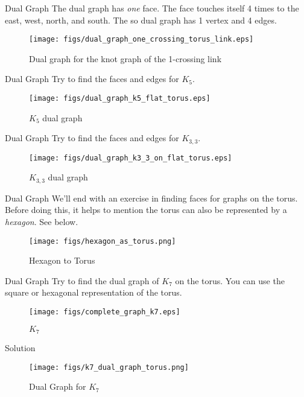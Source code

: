 \documentclass{beamer}
\begin{document}
    \begin{frame}{Dual Graph}
        The dual graph has \textit{one} face. The face touches itself
        4 times to the east, west, north, and south. The so dual graph
        has 1 vertex and 4 edges.
        \begin{figure}
            \centering
            \texttt{[image: figs/dual\_graph\_one\_crossing\_torus\_link.eps]}
            \caption{Dual graph for the knot graph of the 1-crossing link}
            \label{fig:dual_graph_one_crossing_torus_link}
        \end{figure}
    \end{frame}
    \begin{frame}{Dual Graph}
        Try to find the faces and edges for $K_{5}$.
        \begin{figure}
            \centering
            \texttt{[image: figs/dual\_graph\_k5\_flat\_torus.eps]}
            \caption{$K_{5}$ dual graph}
            \label{fig:k5_dual}
        \end{figure}
    \end{frame}
    \begin{frame}{Dual Graph}
        Try to find the faces and edges for $K_{3,3}$.
        \begin{figure}
            \centering
            \texttt{[image: figs/dual\_graph\_k3\_3\_on\_flat\_torus.eps]}
            \caption{$K_{3,3}$ dual graph}
            \label{fig:k3_3_dual}
        \end{figure}
    \end{frame}
    \begin{frame}{Dual Graph}
        We'll end with an exercise in finding faces for graphs on
        the torus. Before doing this, it helps to mention the torus can
        also be represented by a \textit{hexagon}. See below.
        \begin{figure}
            \centering
            \texttt{[image: figs/hexagon\_as\_torus.png]}
            \caption{Hexagon to Torus}
            \label{fig:hexagon_as_torus}
        \end{figure}
    \end{frame}
    \begin{frame}{Dual Graph}
        Try to find the dual graph of $K_{7}$ on the torus. You can use
        the square or hexagonal representation of the torus.
        \begin{figure}
            \centering
            \texttt{[image: figs/complete\_graph\_k7.eps]}
            \caption{$K_{7}$}
            \label{fig:k7}
        \end{figure}
    \end{frame}
    \begin{frame}{Solution}
        \begin{figure}
            \centering
            \texttt{[image: figs/k7\_dual\_graph\_torus.png]}
            \caption{Dual Graph for $K_{7}$}
            \label{fig:k7_dual_graph_torus}
        \end{figure}
    \end{frame}
\end{document}
